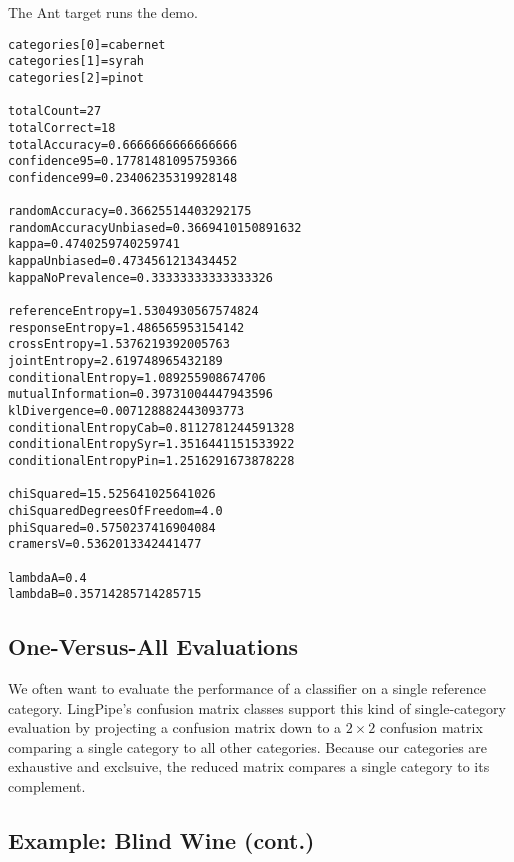 The Ant target  runs the demo.
%
\begin{verbatim}
categories[0]=cabernet
categories[1]=syrah
categories[2]=pinot

totalCount=27
totalCorrect=18
totalAccuracy=0.6666666666666666
confidence95=0.17781481095759366
confidence99=0.23406235319928148

randomAccuracy=0.36625514403292175
randomAccuracyUnbiased=0.3669410150891632
kappa=0.4740259740259741
kappaUnbiased=0.4734561213434452
kappaNoPrevalence=0.33333333333333326

referenceEntropy=1.5304930567574824
responseEntropy=1.486565953154142
crossEntropy=1.5376219392005763
jointEntropy=2.619748965432189
conditionalEntropy=1.089255908674706
mutualInformation=0.39731004447943596
klDivergence=0.007128882443093773
conditionalEntropyCab=0.8112781244591328
conditionalEntropySyr=1.3516441151533922
conditionalEntropyPin=1.2516291673878228

chiSquared=15.525641025641026
chiSquaredDegreesOfFreedom=4.0
phiSquared=0.5750237416904084
cramersV=0.5362013342441477

lambdaA=0.4
lambdaB=0.35714285714285715
\end{verbatim}



\subsection{One-Versus-All Evaluations}\label{section:classifier-eval-one-versus-all}

We often want to evaluate the performance of a classifier on a single
reference category.  LingPipe's confusion matrix classes support this
kind of single-category evaluation by projecting a confusion matrix
down to a $2 \times 2$ confusion matrix comparing a single category to
all other categories.  Because our categories are exhaustive and
exclsuive, the reduced matrix compares a single category to its
complement.

\subsection{Example: Blind Wine (cont.)}

